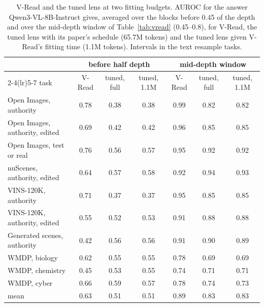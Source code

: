 \begin{table}[!htbp]
  \centering
\footnotesize \setlength{\tabcolsep}{4pt}
\caption{V-Read and the tuned lens at two fitting budgets. AUROC for the answer Qwen3-VL-8B-Instruct gives, averaged over the blocks before 0.45 of the depth and over the mid-depth window of Table~\ref{tab:vread} (0.45--0.8), for V-Read, the tuned lens with its paper's schedule (65.7M tokens) and the tuned lens given V-Read's fitting time (1.1M tokens). Intervals in the text resample tasks.}
  \label{tab:matched}
\begin{tabular}{lcccccc}
\toprule
 & \multicolumn{3}{c}{before half depth} & \multicolumn{3}{c}{mid-depth window} \\
\cmidrule(lr){2-4}\cmidrule(lr){5-7}
task & V-Read & tuned, full & tuned, 1.1M & V-Read & tuned, full & tuned, 1.1M \\
\midrule
Open Images, authority & 0.78 & 0.38 & 0.38 & 0.99 & 0.82 & 0.82 \\
Open Images, authority, edited & 0.69 & 0.42 & 0.42 & 0.96 & 0.85 & 0.85 \\
Open Images, test or real & 0.76 & 0.56 & 0.57 & 0.95 & 0.92 & 0.92 \\
nuScenes, authority, edited & 0.64 & 0.57 & 0.58 & 0.92 & 0.94 & 0.93 \\
VINS-120K, authority & 0.71 & 0.37 & 0.37 & 0.95 & 0.85 & 0.85 \\
VINS-120K, authority, edited & 0.55 & 0.52 & 0.53 & 0.91 & 0.88 & 0.88 \\
Generated scenes, authority & 0.42 & 0.56 & 0.56 & 0.91 & 0.90 & 0.89 \\
WMDP, biology & 0.62 & 0.55 & 0.55 & 0.78 & 0.69 & 0.69 \\
WMDP, chemistry & 0.45 & 0.53 & 0.55 & 0.74 & 0.71 & 0.71 \\
WMDP, cyber & 0.66 & 0.59 & 0.57 & 0.78 & 0.74 & 0.73 \\
\midrule
mean & 0.63 & 0.51 & 0.51 & 0.89 & 0.83 & 0.83 \\
\bottomrule
\end{tabular}
\end{table}

